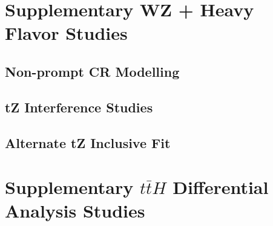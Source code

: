 \documentclass[NOTE, atlasdraft=true, texlive=2016, UKenglish]{\ATLASLATEXPATH atlasdoc}
\begin{document}
\section{Supplementary WZ + Heavy Flavor Studies}
\label{apx:WZ}

\subsection{Non-prompt CR Modelling}
\label{sec:fakeCR_plots}


\subsection{tZ Interference Studies}
\label{sec:tZInt}

                                                                                                                             
\subsection{Alternate tZ Inclusive Fit}
\label{sec:inc_tZ}

                                                                                                                             
\section{Supplementary $t\bar{t}H$ Differential Analysis Studies}                                                            
\label{apx:MVA}                                                                                        
                                                                                    
%  
\section{}
\end{document}
